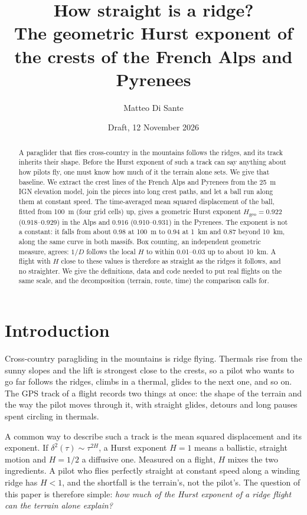 \documentclass[11pt,a4paper]{article}
\title{How straight is a ridge?\\
The geometric Hurst exponent of the crests of the French Alps and Pyrenees}
\author{Matteo Di Sante}
\date{Draft, 12 November 2026}
\newcommand{\Hgeo}{H_{\mathrm{geo}}}
\begin{document}
\maketitle

\begin{abstract}
A paraglider that flies cross-country in the mountains follows the ridges, and
its track inherits their shape. Before the Hurst exponent of such a track can
say anything about how pilots fly, one must know how much of it the terrain
alone sets. We give that baseline. We extract the crest lines of the French
Alps and Pyrenees from the 25~m IGN elevation model, join the pieces into
long crest paths, and let a ball run along them at constant speed. The
time-averaged mean squared displacement of the ball, fitted from 100~m (four
grid cells) up, gives a geometric Hurst exponent $\Hgeo = 0.922$
(0.918--0.929) in the Alps and $0.916$ (0.910--0.931) in the Pyrenees. The
exponent is not a constant: it falls from about 0.98 at 100~m to 0.94 at
1~km and 0.87 beyond 10~km, along the same curve in both massifs. Box
counting, an independent geometric measure, agrees: $1/D$ follows the local
$H$ to within 0.01--0.03 up to about 10~km. A flight with $H$ close to these
values is therefore as straight as the ridges it follows, and no straighter.
We give the definitions, data and code needed to put real flights on the
same scale, and the decomposition (terrain, route, time) the comparison
calls for.
\end{abstract}

\section{Introduction}

Cross-country paragliding in the mountains is ridge flying. Thermals rise
from the sunny slopes and the lift is strongest close to the crests, so a
pilot who wants to go far follows the ridges, climbs in a thermal, glides
to the next one, and so on. The GPS track of a flight records two things at once:
the shape of the terrain and the way the pilot moves through it, with
straight glides, detours and long pauses spent circling in thermals.

A common way to describe such a track is the mean squared displacement and
its exponent. If $\delta^2(\tau) \sim \tau^{2H}$, a Hurst exponent $H=1$ means
a ballistic, straight motion and $H=1/2$ a diffusive one. Measured on a flight,
$H$ mixes the two ingredients. A pilot who flies perfectly straight at constant
speed along a winding ridge has $H<1$, and the shortfall is the terrain's, not
the pilot's. The question of this paper is therefore simple: \emph{how much of
the Hurst exponent of a ridge flight can the terrain alone explain?}
\end{document}
